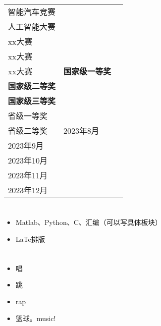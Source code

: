 \documentclass[11pt]{article}
\newlength{\iconwidth}
\begin{document}
	\begin{minipage}[t]{\textwidth}
		\section[竞赛获奖]{}
		
		\begin{tabularx}{\linewidth}{ 
				@{}
				>{\raggedright}p{10.5cm}
				>{\raggedright}X
				>{\raggedleft}p{3cm}
				@{}
			}
			智能汽车竞赛\\
			人工智能大赛\\
			xx大赛\\
			xx大赛\\
			xx大赛
			&
			\textbf{国家级一等奖}\\
			\textbf{国家级二等奖}\\
			\textbf{国家级三等奖}\\
			\quad 省级一等奖\\
			\quad 省级二等奖
			& 2023年8月\\
			2023年9月\\
			2023年10月\\
			2023年11月\\
			2023年12月
		\end{tabularx}
		
	\end{minipage}
	
	\begin{minipage}[t]{0.6\textwidth}
		\section[技能特长]{}
		\begin{itemize}
			\item Matlab、Python、C、汇编（可以写具体板块）
			\item LaTe排版
		\end{itemize}
	\end{minipage}
	\hfill
	\begin{minipage}[t]{0.35\textwidth}
		\section[兴趣爱好]{}
		\begin{itemize}
			\item 唱
			\item 跳
			\item rap
			\item 篮球。music!
		\end{itemize}
	\end{minipage}
	
\end{document}
